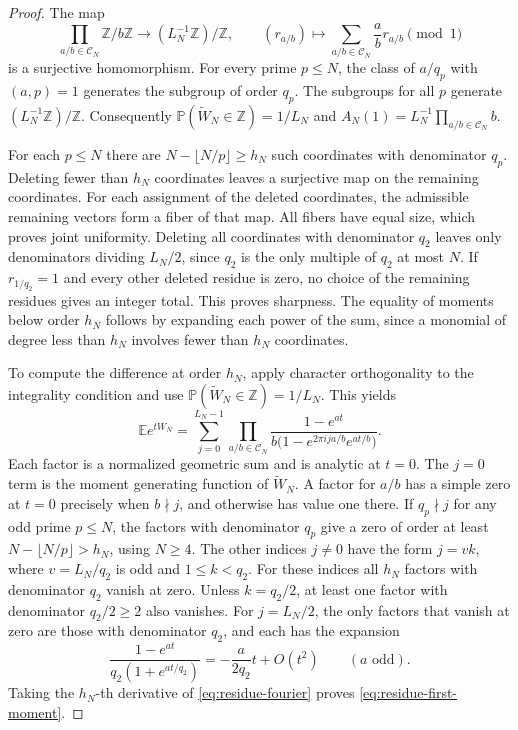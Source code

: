 \documentclass[11pt]{amsart}
\theoremstyle{remark}
\begin{document}
\begin{proof}
The map
\[
 \prod_{a/b\in\mathcal C_N}\mathbb Z/b\mathbb Z
 \longrightarrow (L_N^{-1}\mathbb Z)/\mathbb Z,
 \qquad (r_{a/b})\longmapsto \sum_{a/b\in\mathcal C_N}\frac{a}{b}r_{a/b}\pmod{1}
\]
is a surjective homomorphism. For every prime $p\le N$, the class of $a/q_p$ with $(a,p)=1$ generates the subgroup of order $q_p$. The subgroups for all $p$ generate $(L_N^{-1}\mathbb Z)/\mathbb Z$. Consequently $\mathbb P(\widetilde W_N\in\mathbb Z)=1/L_N$ and $A_N(1)=L_N^{-1}\prod_{a/b\in\mathcal C_N}b$.

For each $p\le N$ there are $N-\lfloor N/p\rfloor\ge h_N$ such coordinates with denominator $q_p$. Deleting fewer than $h_N$ coordinates leaves a surjective map on the remaining coordinates. For each assignment of the deleted coordinates, the admissible remaining vectors form a fiber of that map. All fibers have equal size, which proves joint uniformity. Deleting all coordinates with denominator $q_2$ leaves only denominators dividing $L_N/2$, since $q_2$ is the only multiple of $q_2$ at most $N$. If $r_{1/q_2}=1$ and every other deleted residue is zero, no choice of the remaining residues gives an integer total. This proves sharpness. The equality of moments below order $h_N$ follows by expanding each power of the sum, since a monomial of degree less than $h_N$ involves fewer than $h_N$ coordinates.

To compute the difference at order $h_N$, apply character orthogonality to the integrality condition and use $\mathbb P(\widetilde W_N\in\mathbb Z)=1/L_N$. This yields
\begin{equation}\label{eq:residue-fourier}
 \mathbb E e^{tW_N}=\sum_{j=0}^{L_N-1}
 \prod_{a/b\in\mathcal C_N}
 \frac{1-e^{at}}{b\bigl(1-e^{2\pi ija/b}e^{at/b}\bigr)}.
\end{equation}
Each factor is a normalized geometric sum and is analytic at $t=0$. The $j=0$ term is the moment generating function of $\widetilde W_N$. A factor for $a/b$ has a simple zero at $t=0$ precisely when $b\nmid j$, and otherwise has value one there. If $q_p\nmid j$ for any odd prime $p\le N$, the factors with denominator $q_p$ give a zero of order at least $N-\lfloor N/p\rfloor>h_N$, using $N\ge4$. The other indices $j\ne0$ have the form $j=vk$, where $v=L_N/q_2$ is odd and $1\le k<q_2$. For these indices all $h_N$ factors with denominator $q_2$ vanish at zero. Unless $k=q_2/2$, at least one factor with denominator $q_2/2\ge2$ also vanishes. For $j=L_N/2$, the only factors that vanish at zero are those with denominator $q_2$, and each has the expansion
\[
 \frac{1-e^{at}}{q_2(1+e^{at/q_2})}=-\frac{a}{2q_2}t+O(t^2)\qquad(a\text{ odd}).
\]
Taking the $h_N$-th derivative of \eqref{eq:residue-fourier} proves \eqref{eq:residue-first-moment}.
\end{proof}
\end{document}
